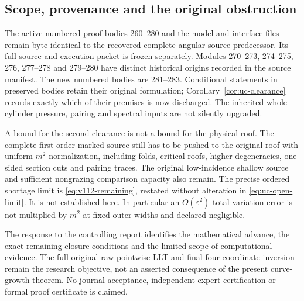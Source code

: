 \documentclass[11pt,reqno]{amsart}
\numberwithin{equation}{section}
\theoremstyle{definition}\newtheorem{definition}[theorem]{Definition}
\theoremstyle{remark}\newtheorem{remark}[theorem]{Remark}
\begin{document}
\subsection*{Scope, provenance and the original obstruction}
The active numbered proof bodies 260--280 and the model and interface
files remain byte-identical to the recovered complete angular-source
predecessor. Its full source and execution packet is frozen separately.
Modules 270--273, 274--275, 276, 277--278 and 279--280 have distinct
historical origins recorded in the source manifest. The new numbered
bodies are 281--283. Conditional statements in preserved bodies retain
their original formulation; Corollary~\ref{cor:uc-clearance} records
exactly which of their premises is now discharged. The inherited
whole-cylinder pressure, pairing and spectral inputs are not silently
upgraded.

A bound for the second clearance is not a bound for the physical roof.
The complete first-order marked source still has to be pushed to the
original roof with uniform $m^2$ normalization, including folds, critical
roofs, higher degeneracies, one-sided section cuts and pairing traces.
The original low-incidence shallow source and sufficient nongrazing
comparison capacity also remain. The precise ordered shortage limit is
\eqref{eq:v112-remaining}, restated without alteration in
\eqref{eq:uc-open-limit}. It is not established here. In particular an
$O(\varepsilon^2)$ total-variation error is not multiplied by $m^2$ at
fixed outer widths and declared negligible.

The response to the controlling report identifies the mathematical
advance, the exact remaining closure conditions and the limited scope of
computational evidence. The full original raw pointwise LLT and final
four-coordinate inversion remain the research objective, not an asserted
consequence of the present curve-growth theorem. No journal acceptance,
independent expert certification or formal proof certificate is claimed.
\end{document}
